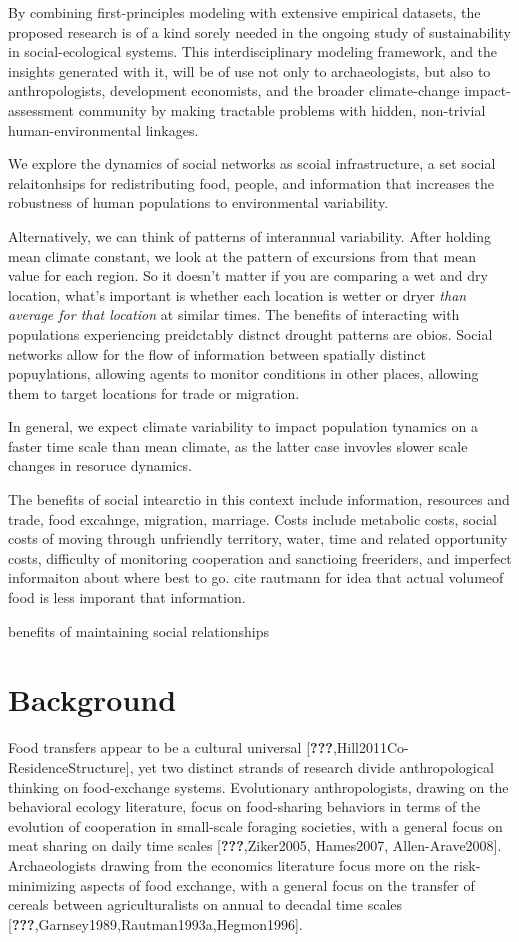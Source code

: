 \documentclass[10pt,letterpaper]{article}
\begin{document}
By combining first-principles modeling with extensive empirical
datasets, the proposed research is of a kind sorely needed in the
ongoing study of sustainability in social-ecological systems. This
interdisciplinary modeling framework, and the insights generated with
it, will be of use not only to archaeologists, but also to
anthropologists, development economists, and the broader climate-change
impact-assessment community by making tractable problems with hidden,
non-trivial human-environmental linkages.

We explore the dynamics of social networks as scoial infrastructure, a
set social relaitonhsips for redistributing food, people, and
information that increases the robustness of human populations to
environmental variability.

Alternatively, we can think of patterns of interannual variability.
After holding mean climate constant, we look at the pattern of
excursions from that mean value for each region. So it doesn't matter if
you are comparing a wet and dry location, what's important is whether
each location is wetter or dryer \emph{than average for that location}
at similar times. The benefits of interacting with populations
experiencing preidctably distnct drought patterns are obios. Social
networks allow for the flow of information between spatially distinct
popuylations, allowing agents to monitor conditions in other places,
allowing them to target locations for trade or migration.

In general, we expect climate variability to impact population tynamics
on a faster time scale than mean climate, as the latter case invovles
slower scale changes in resoruce dynamics.

The benefits of social intearctio in this context include information,
resources and trade, food excahnge, migration, marriage. Costs include
metabolic costs, social costs of moving through unfriendly territory,
water, time and related opportunity costs, difficulty of monitoring
cooperation and sanctioing freeriders, and imperfect informaiton about
where best to go. cite rautmann for idea that actual volumeof food is
less imporant that information.

benefits of maintaining social relationships

\section{Background}\label{background}

Food transfers appear to be a cultural universal
{[}{\textbf{???}},Hill2011Co-ResidenceStructure{]}, yet two distinct
strands of research divide anthropological thinking on food-exchange
systems. Evolutionary anthropologists, drawing on the behavioral ecology
literature, focus on food-sharing behaviors in terms of the evolution of
cooperation in small-scale foraging societies, with a general focus on
meat sharing on daily time scales {[}{\textbf{???}},Ziker2005,
Hames2007, Allen-Arave2008{]}. Archaeologists drawing from the economics
literature focus more on the risk-minimizing aspects of food exchange,
with a general focus on the transfer of cereals between agriculturalists
on annual to decadal time scales
{[}{\textbf{???}},Garnsey1989,Rautman1993a,Hegmon1996{]}.
\end{document}
